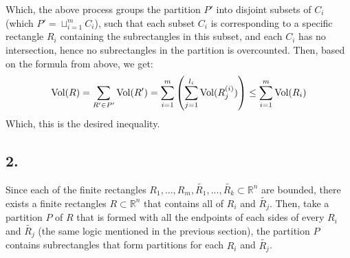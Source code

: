 \documentclass{article}
\begin{document}
Which, the above process groups the partition $P'$ into disjoint subsets of $C_i$ (which $P' = \sqcup_{i=1}^{m}C_i$), such that each subset $C_i$ is corresponding to a specific rectangle $R_i$ containing the subrectangles in this subset, and each $C_i$ has no intersection, hence no subrectangles in the partition is overcounted. Then, based on the formula from above, we get:
\begin{equation}
    \textmd{Vol}(R) = \sum_{R'\in P'}\textmd{Vol}(R') = \sum_{i=1}^{m}\left(\sum_{j=1}^{l_i}\textmd{Vol}(R_j^{(i)})\right)\leq \sum_{i=1}^{m}\textmd{Vol}(R_i)
\end{equation}
Which, this is the desired inequality.

\subsection*{2.}
Since each of the finite rectangles $R_1,...,R_m,\tilde{R_1},...,\tilde{R_k}\subset\mathbb{R}^n$ are bounded, there exists a finite rectangles $R\subset\mathbb{R}^n$ that contains all of $R_i$ and $\tilde{R_j}$. Then, take a partition $P$ of $R$ that is formed with all the endpoints of each sides of every $R_i$ and $\tilde{R_j}$ (the same logic mentioned in the previous section), the partition $P$ contains subrectangles that form partitions for each $R_i$ and $\tilde{R_j}$.
\end{document}
